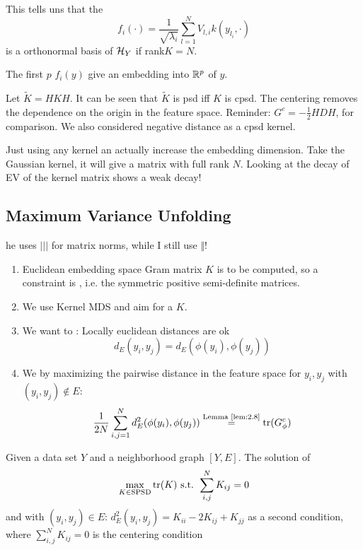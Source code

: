 This tells uns that the 
\[f_i(\cdot)=\frac{1}{\sqrt{\lambda_i}}\sum_{l=1}^N V_{l,i}k(y_{l_i},\cdot)\]
is a orthonormal basis of $\mathcal{H}_Y$ if rank$K=N$.

The first $p$ $f_i(y)$ give an embedding into $\mathbb{R}^p$ of $y$.

\begin{remark}
    Let $\tilde{K}=HKH$. It can be seen that $\tilde{K}$ is psd iff $K$ is cpsd. The centering removes 
    the dependence on the origin in the feature space.
    Reminder: $G^c=-\frac{1}{2}HDH$, for comparison. We also considered negative distance as a cpsd kernel.
\end{remark}

\begin{remark}
    Just using any kernel an actually increase the embedding dimension. Take the Gaussian kernel, it will give a matrix with full rank $N$.
    Looking at the decay of EV of the kernel matrix shows a weak decay!     
\end{remark}

\subsection{Maximum Variance Unfolding}

\begin{aremark}
    he uses $\vert\vert\vert$ for matrix norms, while I still use $\Vert$!
\end{aremark}

\begin{enumerate}
    \item Euclidean embedding space Gram matrix $K$ is to be computed, so a constraint is , i.e. the symmetric positive semi-definite matrices.
    \item We use Kernel MDS and aim for a  $K$. 
    \item We want to : Locally euclidean distances are ok \[d_E(y_i,y_j)=d_E(\phi(y_i),\phi(y_j))\]
    \item We  by maximizing the pairwise distance in the feature space for $y_i,y_j$ with $(y_i,y_j)\notin E$:\[\frac{1}{2N}\sum_{i,j=1}^Nd_E^2(\phi(y_i),\phi(y_j))\stackrel{\text{Lemma \ref{lem:2.8}}}{=}\text{tr}(G_\phi^c)\]
\end{enumerate}

\begin{definition}\label{def:2.16}
    Given a data set $Y$ and a neighborhood graph $[Y,E]$. The solution of 
    \begin{eqnarray}
        \max_{K\in\text{SPSD}} \text{tr}(K)\text{ s.t. } \sum_{i,j}^N K_{ij}=0 \label{eq:2.1}
    \end{eqnarray}
    and with $(y_i,y_j)\in E$: $d_E^2(y_i,y_j)=K_{ii}-2K_{ij}+K_{jj}$ as a second condition,
    where $\sum_{i,j}^N K_{ij}=0$ is the centering condition
\end{definition}


